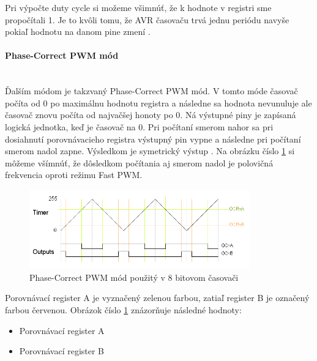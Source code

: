 Pri výpočte  duty cycle si možeme všimnúť, že k hodnote v registri sme propočítali 1. Je to kvôli tomu, že AVR časovaču trvá jednu periódu navyše pokiaľ hodnotu
na danom pine zmení \cite{shirriffSecretsArduinoPWM}.
\paragraph{Phase-Correct PWM mód} \mbox{}\\
Ďalším módom je takzvaný Phase-Correct PWM mód. V tomto móde časovač počíta od 0 po maximálnu hodnotu registra a následne sa hodnota nevunuluje
ale časovač znovu počíta od najvačšej honoty po 0. Ná výstupné piny je zapísaná logická jednotka, keď je časovač na 0. Pri počítaní smerom nahor sa pri dosiahnutí porovnávacieho registra výstupný pin vypne
a následne pri počítaní smerom nadol zapne. Výsledkom je symetrický výstup \cite{shirriffSecretsArduinoPWM}. Na obrázku  číslo \ref{figure:phase-correct-pwm-mode} si môžeme všímnúť,
že dôsledkom počítania aj smerom nadol je polovičná frekvencia oproti režimu Fast PWM.

\begin{figure}[!h]
    \centering
    \includegraphics[width=0.85\textwidth]{img/phase-correct.png}
    \caption{Phase-Correct PWM mód použitý v 8 bitovom časovači}
    \label{figure:phase-correct-pwm-mode}
\end{figure}

Porovnávací register A je vyznačený zelenou farbou, zatiaľ register B je označený farbou červenou. Obrázok číslo \ref{figure:phase-correct-pwm-mode} znázorňuje následné hodnoty:
\begin{itemize}
    \item Porovnávací register A
    \item Porovnávací register B
\end{itemize}
